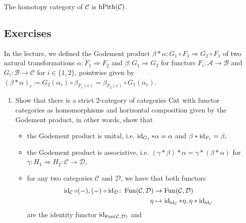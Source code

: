 \begin{defi}
	The homotopy category of $ \mathcal{ C } $ is $ \operatorname{hPith} ( \mathcal{ C } ) $.
\end{defi}

\subsection{Exercises}

\begin{Exercise}
	In the lecture, we defined the Godement product $ \beta * \alpha \colon G_1 \circ F_1 \Rightarrow G_2 \circ F_1 $ of two natural transformations $ \alpha \colon F_1 \Rightarrow F_2 $ and $ \beta \colon G_1 \Rightarrow G_2 $ for functors $ F_i \colon \mathcal{ A } \to \mathcal{ B } $ and $ G_i \colon \mathcal{ B } \to \mathcal{ C } $ for $ i \in \{ 1 , 2 \} $, pointwise given by $  (\beta * \alpha )_c \coloneqq G_2 ( \alpha_c ) \circ \beta_{ F_1 ( c ) } = \beta_{ F_2 ( c ) } \circ G_1 ( \alpha_c ) $.
	
	\begin{enumerate}[label=(\alph*)]
		\item 
		Show that there is a strict 2-category of categories $ \operatorname{Cat} $ with functor categories as homomorphisms and horizontal composition given by the Godement product, in other words, show that 
		\begin{itemize}
			\item 
			the Godement product is unital, i.e. $\operatorname{id}_{G_1} * \alpha = \alpha$ and $ \beta * \operatorname{id}_{F_1} =\beta,$
			
			\item 
			the Godement product is associative, i.e. $ ( \gamma * \beta) * \alpha = \gamma * ( \beta * \alpha ) $ for $ \gamma \colon H_1 \Rightarrow H_2 \colon \mathcal{ C } \to \mathcal{ D } $,
			
			\item 
			for any two categories $ \mathcal{ C } $ and $ \mathcal{ D } $, we have that both functors 
			\begin{align*}
				\operatorname{id}_{ \mathcal{ C } } \circ ( - ) , ( - ) \circ  \operatorname{id}_{ \mathcal{ D } }\colon \operatorname{Fun} ( \mathcal{ C } , \mathcal{ D } ) 
				&\to 
				\operatorname{Fun} ( \mathcal{ C } , \mathcal{ D } )
				\\
				\eta 
				&\mapsto 
				\operatorname{id}_{\operatorname{id}_{\mathcal{ C }}} * \eta , \eta * \operatorname{id}_{\operatorname{id}_{\mathcal{ C }}}
			\end{align*}
			are the identity functor $ \operatorname{id}_{ \operatorname{Fun}( \mathcal{ C } , \mathcal{ D } ) } $ and
			

\end{itemize}
\end{enumerate}
\end{Exercise}

